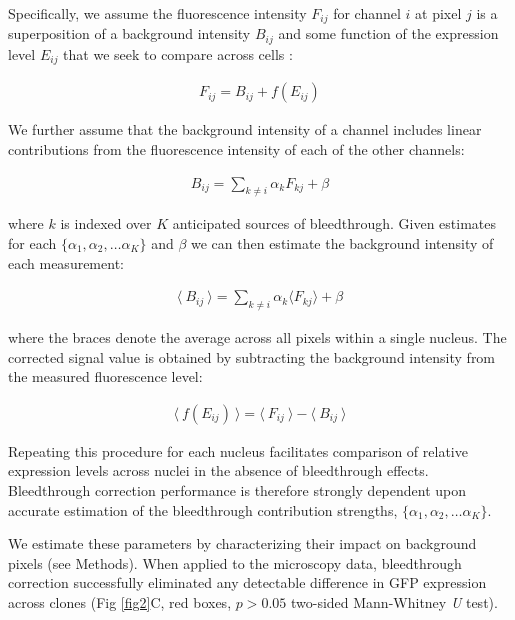 \documentclass[10pt,letterpaper]{article}
\begin{document}
Specifically, we assume the fluorescence intensity $F_{ij}$ for channel $i$ at pixel $j$ is a superposition of a background intensity $B_{ij}$ and some function of the expression level $E_{ij}$ that we seek to compare across cells \cite{McMullen2010}:
\begin{linenomath} \begin{gather}
F_{ij} = B_{ij} + f(E_{ij})
\end{gather} \end{linenomath}
We further assume that the background intensity of a channel includes linear contributions from the fluorescence intensity of each of the other channels:
\begin{linenomath} \begin{gather}
B_{ij} = \sum_{k \neq i}{\alpha_k F_{kj}} + \beta
\end{gather} \end{linenomath}
where $k$ is indexed over $K$ anticipated sources of bleedthrough. Given estimates for each $\{\alpha_1, \alpha_2, \ldots \alpha_K\}$ and $\beta$ we can then estimate the background intensity of each measurement:
\begin{linenomath} \begin{gather} \label{eq:bg_model}
\langle\ B_{ij}\ \rangle = \sum_{k \neq i}{\alpha_k \langle F_{kj} \rangle} + \beta
\end{gather} \end{linenomath}
where the braces denote the average across all pixels within a single nucleus. The corrected signal value is obtained by subtracting the background intensity from the measured fluorescence level:
\begin{linenomath} \begin{gather} \label{eq:correction}
\langle\ f(E_{ij}) \ \rangle = \langle\ F_{ij}\ \rangle - \langle\ B_{ij}\ \rangle
\end{gather} \end{linenomath}

Repeating this procedure for each nucleus facilitates comparison of relative expression levels across nuclei in the absence of bleedthrough effects. Bleedthrough correction performance is therefore strongly dependent upon accurate estimation of the bleedthrough contribution strengths, $\{\alpha_1, \alpha_2, \ldots \alpha_K\}$. 

We estimate these parameters by characterizing their impact on background pixels (see Methods). When applied to the microscopy data, bleedthrough correction successfully eliminated any detectable difference in GFP expression across clones (Fig \ref{fig2}C, red boxes, $p>0.05$ two-sided Mann-Whitney \textit{U} test).
\end{document}
